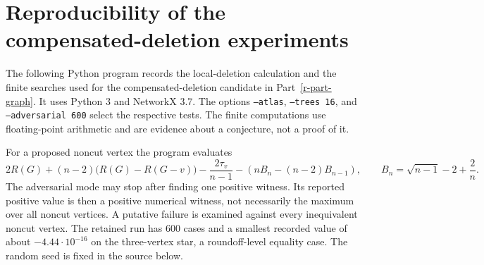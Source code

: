 \documentclass[11pt,a4paper]{article}
\theoremstyle{definition}
\theoremstyle{remark}
\begin{document}
\clearpage
\appendix
\section{Reproducibility of the compensated-deletion experiments}\label{r-graph-code}
The following Python program records the local-deletion calculation and
the finite searches used for the compensated-deletion candidate in
Part~\ref{r-part-graph}. It uses Python 3 and NetworkX 3.7. The options
\texttt{--atlas}, \texttt{--trees 16}, and \texttt{--adversarial 600}
select the respective tests. The finite computations use floating-point
arithmetic and are evidence about a conjecture, not a proof of it.

For a proposed noncut vertex the program evaluates
\[
 2R(G)+(n-2)\bigl(R(G)-R(G-v)\bigr)
 -\frac{2\tau_v}{n-1}
 -\left(nB_n-(n-2)B_{n-1}\right),
 \qquad B_n=\sqrt{n-1}-2+\frac2n.
\]
The adversarial mode may stop after finding one positive witness. Its
reported positive value is then a positive numerical witness,
not necessarily the maximum over all noncut vertices. A
putative failure is examined against every inequivalent noncut vertex.
The retained run has 600 cases and a smallest recorded value of about
$-4.44\cdot10^{-16}$ on the three-vertex star, a roundoff-level equality
case. The random seed is fixed in the source below.
\end{document}

